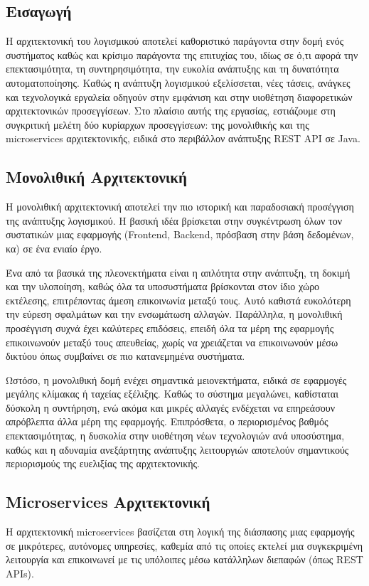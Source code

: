 \subsection{Εισαγωγή}
Η αρχιτεκτονική του λογισμικού αποτελεί καθοριστικό παράγοντα στην δομή ενός συστήματος καθώς και κρίσιμο παράγοντα της επιτυχίας του,  ιδίως σε ό,τι αφορά την επεκτασιμότητα, τη συντηρησιμότητα, την ευκολία ανάπτυξης και τη δυνατότητα αυτοματοποίησης. Καθώς η ανάπτυξη λογισμικού εξελίσσεται, νέες τάσεις, ανάγκες και τεχνολογικά εργαλεία οδηγούν στην εμφάνιση και στην υιοθέτηση διαφορετικών αρχιτεκτονικών προσεγγίσεων. Στο πλαίσιο αυτής της εργασίας, εστιάζουμε στη συγκριτική μελέτη δύο κυρίαρχων προσεγγίσεων: της μονολιθικής και της microservices αρχιτεκτονικής, ειδικά στο περιβάλλον ανάπτυξης REST API σε Java.

\subsection{Μονολιθική Αρχιτεκτονική}
Η μονολιθική αρχιτεκτονική αποτελεί την πιο ιστορική και παραδοσιακή προσέγγιση της ανάπτυξης λογισμικού. Η βασική ιδέα βρίσκεται στην συγκέντρωση όλων τον συστατικών μιας εφαρμογής (Frontend, Backend, πρόσβαση στην βάση δεδομένων, κα) σε ένα ενιαίο έργο.

Ένα από τα βασικά της πλεονεκτήματα είναι η απλότητα στην ανάπτυξη, τη δοκιμή και την υλοποίηση, καθώς όλα τα υποσυστήματα βρίσκονται στον ίδιο χώρο εκτέλεσης, επιτρέποντας άμεση επικοινωνία μεταξύ τους. Αυτό καθιστά ευκολότερη την εύρεση σφαλμάτων και την ενσωμάτωση αλλαγών. Παράλληλα, η μονολιθική προσέγγιση συχνά έχει καλύτερες επιδόσεις, επειδή όλα τα μέρη της εφαρμογής επικοινωνούν μεταξύ τους απευθείας, χωρίς να χρειάζεται να επικοινωνούν μέσω δικτύου όπως συμβαίνει σε πιο κατανεμημένα συστήματα.

Ωστόσο, η μονολιθική δομή ενέχει σημαντικά μειονεκτήματα, ειδικά σε εφαρμογές μεγάλης κλίμακας ή ταχείας εξέλιξης. Καθώς το σύστημα μεγαλώνει, καθίσταται δύσκολη η συντήρηση, ενώ ακόμα και μικρές αλλαγές ενδέχεται να επηρεάσουν απρόβλεπτα άλλα μέρη της εφαρμογής. Επιπρόσθετα, ο περιορισμένος βαθμός επεκτασιμότητας, η δυσκολία στην υιοθέτηση νέων τεχνολογιών ανά υποσύστημα, καθώς και η αδυναμία ανεξάρτητης ανάπτυξης λειτουργιών αποτελούν σημαντικούς περιορισμούς της ευελιξίας της αρχιτεκτονικής.

\subsection{Microservices Αρχιτεκτονική} 
Η αρχιτεκτονική microservices βασίζεται στη λογική της διάσπασης μιας εφαρμογής σε μικρότερες, αυτόνομες υπηρεσίες, καθεμία από τις οποίες εκτελεί μια συγκεκριμένη λειτουργία και επικοινωνεί με τις υπόλοιπες μέσω κατάλληλων διεπαφών (όπως REST APIs). 

